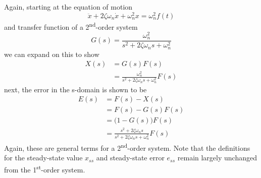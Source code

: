 \documentclass[12pt,letter]{article}
\begin{document}
%



Again, starting at the equation of motion
\begin{equation}
\ddot{x} + 2 \zeta \omega_n \dot{x} + \omega_n^2 x = \omega_n^2 f(t)
\end{equation}
and transfer function of a 2\textsuperscript{nd}-order system
\begin{equation}
G(s) = \frac{\omega_n^2}{s^2 + 2 \zeta \omega_n s + \omega_n^2}
\end{equation}
we can expand on this to show
\begin{align}
X(s) &= G(s)F(s) \\
&=  \frac{\omega_n^2}{s^2 + 2 \zeta \omega_n s + \omega_n^2} F(s) \nonumber
\end{align}
next, the error in the s-domain is shown to be
\begin{align}
E(s) &= F(s) - X(s) \\
&= F(s) - G(s)F(s) \nonumber \\ 
&= \big( 1-G(s) \big) F(s) \nonumber \\  
&= \frac{s^2 + 2 \zeta \omega_n s}{s^2 + 2 \zeta \omega_n s + \omega_n^2} F(s) \nonumber
\end{align}
Again, these are general terms for a 2\textsuperscript{nd}-order system. Note that the definitions for the steady-state value $x_{ss}$ and steady-state error $e_{ss}$ remain largely unchanged from the 1\textsuperscript{st}-order system.
\end{document}
